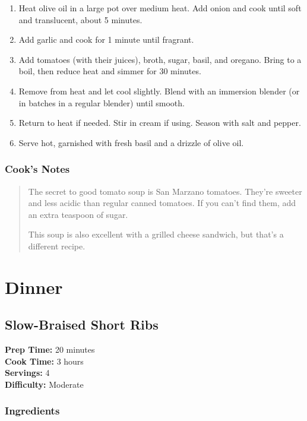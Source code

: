\documentclass[
    language=english,
    doctype=recipe-book,
    institution=none,
]{../../omnilatex}
\begin{document}
\begin{enumerate}
    \item Heat olive oil in a large pot over medium heat. Add onion and cook until soft and translucent, about 5 minutes.
    \item Add garlic and cook for 1 minute until fragrant.
    \item Add tomatoes (with their juices), broth, sugar, basil, and oregano. Bring to a boil, then reduce heat and simmer for 30 minutes.
    \item Remove from heat and let cool slightly. Blend with an immersion blender (or in batches in a regular blender) until smooth.
    \item Return to heat if needed. Stir in cream if using. Season with salt and pepper.
    \item Serve hot, garnished with fresh basil and a drizzle of olive oil.
\end{enumerate}

\subsection*{Cook's Notes}
\begin{quote}
The secret to good tomato soup is San Marzano tomatoes. They're sweeter and less acidic than regular canned tomatoes. If you can't find them, add an extra teaspoon of sugar.

This soup is also excellent with a grilled cheese sandwich, but that's a different recipe.
\end{quote}

\chapter{Dinner}

\section*{Slow-Braised Short Ribs}

\begin{recipebox}
\textbf{Prep Time:} 20 minutes\\
\textbf{Cook Time:} 3 hours\\
\textbf{Servings:} 4\\
\textbf{Difficulty:} Moderate
\end{recipebox}

\subsection*{Ingredients}
\end{document}
